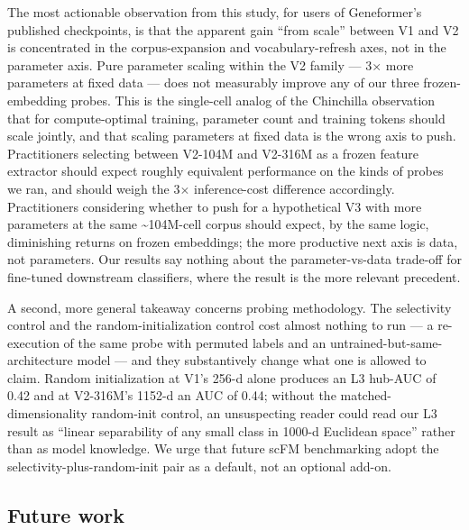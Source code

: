 \documentclass[
  11pt,
]{article}
\begin{document}
The most actionable observation from this study, for users of
Geneformer's published checkpoints, is that the apparent gain ``from
scale'' between V1 and V2 is concentrated in the corpus-expansion and
vocabulary-refresh axes, not in the parameter axis. Pure parameter
scaling within the V2 family --- 3$\times$ more parameters at fixed data ---
does not measurably improve any of our three frozen-embedding probes.
This is the single-cell analog of the Chinchilla observation \citep{hoffmann2022chinchilla} that for compute-optimal training, parameter count and
training tokens should scale jointly, and that scaling parameters at
fixed data is the wrong axis to push. Practitioners selecting between
V2-104M and V2-316M as a frozen feature extractor should expect roughly
equivalent performance on the kinds of probes we ran, and should weigh
the 3$\times$ inference-cost difference accordingly. Practitioners considering
whether to push for a hypothetical V3 with more parameters at the same
\textasciitilde104M-cell corpus should expect, by the same logic,
diminishing returns on frozen embeddings; the more productive next axis
is data, not parameters. Our results say nothing about the
parameter-vs-data trade-off for fine-tuned downstream classifiers, where
the \citet{venkatesh2026} result is the more relevant precedent.

A second, more general takeaway concerns probing methodology. The
selectivity control \citep{hewitt2019} and the random-initialization
control \citep{zhang2018random} cost almost nothing to run --- a
re-execution of the same probe with permuted labels and an
untrained-but-same-architecture model --- and they substantively change
what one is allowed to claim. Random initialization at V1's 256-d alone
produces an L3 hub-AUC of 0.42 and at V2-316M's 1152-d an AUC of 0.44;
without the matched-dimensionality random-init control, an unsuspecting
reader could read our L3 result as ``linear separability of any small
class in 1000-d Euclidean space'' rather than as model knowledge. We
urge that future scFM benchmarking adopt the
selectivity-plus-random-init pair as a default, not an optional add-on.

\subsection{Future work}\label{future-work}
\end{document}
